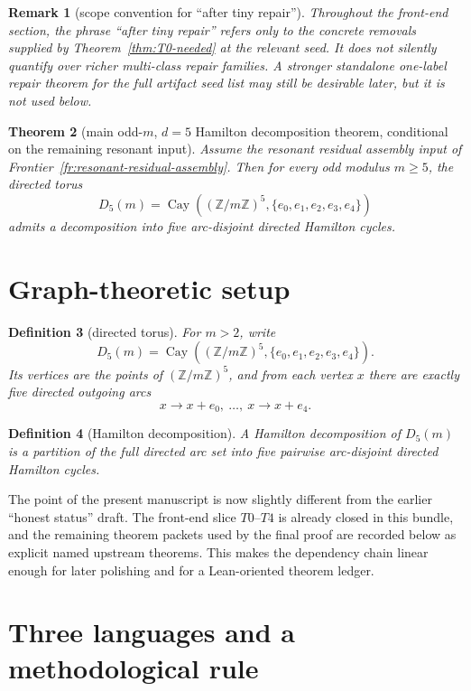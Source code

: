 \documentclass[11pt]{article}
\newtheorem{theorem}{Theorem}[section]
\newtheorem{remark}[theorem]{Remark}
\newtheorem{definition}[theorem]{Definition}
\newcommand{\Z}{\mathbb Z}
\begin{document}
\begin{remark}[scope convention for ``after tiny repair'']
Throughout the front-end section, the phrase ``after tiny repair'' refers only
to the concrete removals supplied by Theorem~\ref{thm:T0-needed} at the relevant
seed.  It does not silently quantify over richer multi-class repair families.
A stronger standalone one-label repair theorem for the full artifact seed list
may still be desirable later, but it is not used below.
\end{remark}


\begin{theorem}[main odd-$m$, $d=5$ Hamilton decomposition theorem, conditional on the remaining resonant input]
\label{thm:conditional-full}
Assume the resonant residual assembly input of
Frontier~\ref{fr:resonant-residual-assembly}.
Then for every odd modulus $m\ge 5$, the directed torus
\[
D_5(m)=\operatorname{Cay}((\Z/m\Z)^5,\{e_0,e_1,e_2,e_3,e_4\})
\]
admits a decomposition into five arc-disjoint directed Hamilton cycles.
\end{theorem}

\section{Graph-theoretic setup}

\begin{definition}[directed torus]
For \(m>2\), write
\[
D_5(m)=\operatorname{Cay}((\Z/m\Z)^5,\{e_0,e_1,e_2,e_3,e_4\}).
\]
Its vertices are the points of \((\Z/m\Z)^5\), and from each vertex \(x\) there
are exactly five directed outgoing arcs
\[
x\to x+e_0,\ \dots,\ x\to x+e_4.
\]
\end{definition}

\begin{definition}[Hamilton decomposition]
A \emph{Hamilton decomposition} of \(D_5(m)\) is a partition of the full
directed arc set into five pairwise arc-disjoint directed Hamilton cycles.
\end{definition}

The point of the present manuscript is now slightly different from the earlier
``honest status'' draft.
The front-end slice $T0$--$T4$ is already
closed in this bundle, and the remaining theorem packets used by the final
proof are recorded below as explicit named upstream theorems.
This makes the dependency chain linear enough for later polishing and for a
Lean-oriented theorem ledger.

\section{Three languages and a methodological rule}
\end{document}

